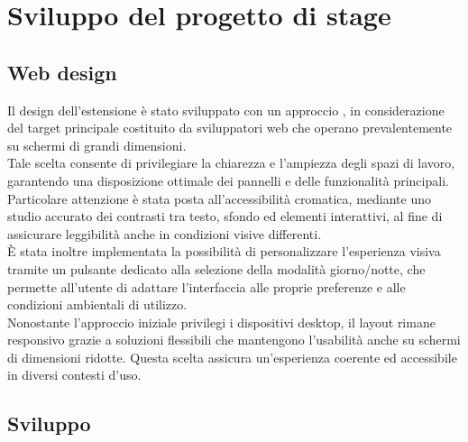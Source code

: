 \chapter{Sviluppo del progetto di stage}
\label{chap:sviluppo}

\section{Web design}
\noindent Il design dell’estensione è stato sviluppato con un approccio , in considerazione del target principale costituito da sviluppatori web che operano prevalentemente su schermi di grandi dimensioni. \\Tale scelta consente di privilegiare la chiarezza e l’ampiezza degli spazi di lavoro, garantendo una disposizione ottimale dei pannelli e delle funzionalità principali.\\
Particolare attenzione è stata posta all’accessibilità cromatica, mediante uno studio accurato dei contrasti tra testo, sfondo ed elementi interattivi, al fine di assicurare leggibilità anche in condizioni visive differenti. \\È stata inoltre implementata la possibilità di personalizzare l’esperienza visiva tramite un pulsante dedicato alla selezione della modalità giorno/notte, che permette all’utente di adattare l’interfaccia alle proprie preferenze e alle condizioni ambientali di utilizzo.\\
Nonostante l’approccio iniziale privilegi i dispositivi desktop, il layout rimane responsivo grazie a soluzioni flessibili che mantengono l’usabilità anche su schermi di dimensioni ridotte. Questa scelta assicura un’esperienza coerente ed accessibile in diversi contesti d’uso.

\section{Sviluppo}
